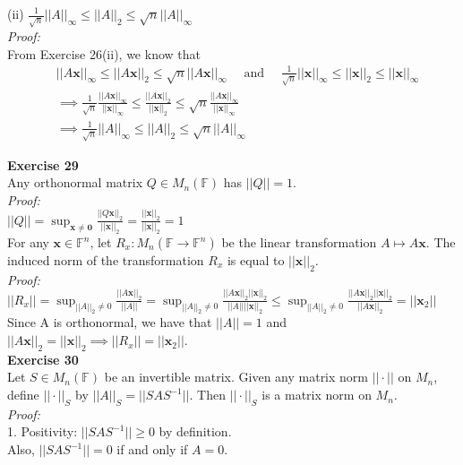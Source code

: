 \documentclass[letterpaper,12pt]{article}
\let\vec\mathbf
\theoremstyle{definition}
\begin{document}
(ii) $\frac{1}{\sqrt{n}} ||A||_\infty \leq ||A||_2 \leq \sqrt{n} ||A||_\infty$ \\
\textit{Proof:} \\
From Exercise 26(ii), we know that
\begin{align*}
  &||A\vec{x}||_\infty \leq ||A\vec{x}||_2 \leq \sqrt{n} ||A\vec{x}||_\infty \quad \text{ and } \quad \frac{1}{\sqrt{n}} ||\vec{x}||_\infty \leq ||\vec{x}||_2 \leq ||\vec{x}||_\infty \\
  & \implies \frac{1}{\sqrt{n}} \frac{||A\vec{x}||_\infty}{||\vec{x}||_\infty} \leq \frac{||A\vec{x}||_2}{||\vec{x}||_2} \leq \sqrt{n} \frac{||A\vec{x}||_\infty}{||\vec{x}||_\infty} \\
  & \implies \frac{1}{\sqrt{n}} ||A||_\infty \leq ||A||_2 \leq \sqrt{n} ||A||_\infty
\end{align*}

\textbf{Exercise 29} \\
Any orthonormal matrix $Q \in M_n(\mathbb{F})$ has $||Q||=1$. \\
\textit{Proof:} \\
$||Q|| = \sup_{\vec{x} \neq \vec{0}} \frac{||Q\vec{x}||_2}{||\vec{x}||_2} = \frac{||\vec{x}||_2}{||\vec{x}||_2} = 1$ \\

For any $\vec{x} \in \mathbb{F}^n$, let $R_x: M_n(\mathbb{F} \rightarrow \mathbb{F}^n)$ be the linear transformation $A \mapsto A\vec{x}$. The induced norm of the transformation $R_x$ is equal to $||\vec{x}||_2$. \\
\textit{Proof:} \\
$||R_x|| = \sup_{||A||_2 \neq 0} \frac{||A\vec{x}||_2}{||A||} = \sup_{||A||_2 \neq 0} \frac{||A\vec{x}||_2 ||\vec{x}||_2}{||A||||\vec{x}||_2} \leq \sup_{||A||_2 \neq 0} \frac{||A\vec{x}||_2 ||\vec{x}||_2}{||A\vec{x}||_2} = ||\vec{x}_2||$ \\
Since A is orthonormal, we have that $||A|| = 1$ and $||A\vec{x}||_2 = ||\vec{x}||_2 \implies ||R_x|| = ||\vec{x}_2||$. \\

\textbf{Exercise 30} \\
Let $S \in M_n(\mathbb{F})$ be an invertible matrix. Given any matrix norm $||\cdot||$ on $M_n$, define $||\cdot||_S$ by $||A||_S = ||SAS^{-1}||$. Then $||\cdot||_S$ is a matrix norm on $M_n$. \\
\textit{Proof:} \\
1. Positivity: $||SAS^{-1}|| \geq 0$ by definition. \\
Also, $||SAS^{-1}|| = 0$ if and only if $A = 0$. \\
\end{document}
